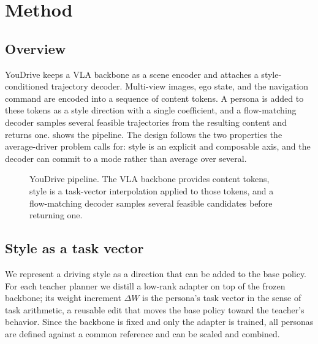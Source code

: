 \section{Method}
\label{sec:method}

\subsection{Overview}
\label{sec:method:overview}
YouDrive keeps a VLA backbone as a scene encoder and attaches a style-conditioned
trajectory decoder. Multi-view images, ego state, and the navigation command are
encoded into a sequence of content tokens. A persona is added to these tokens as a
style direction with a single coefficient, and a flow-matching decoder samples
several feasible trajectories from the resulting content and returns one.
 shows the pipeline. The design follows the two properties the
average-driver problem calls for: style is an explicit and composable axis, and the
decoder can commit to a mode rather than average over several.

\begin{figure}[t]
    \centering
    \caption{YouDrive pipeline. The VLA backbone provides content tokens, style is
    a task-vector interpolation applied to those tokens, and a flow-matching decoder
    samples several feasible candidates before returning one.}
    \label{fig:pipeline}
\end{figure}

\subsection{Style as a task vector}
\label{sec:method:style}
We represent a driving style as a direction that can be added to the base policy.
For each teacher planner we distill a low-rank adapter on top of the frozen
backbone; its weight increment $\Delta W$ is the persona's task vector in the sense
of task arithmetic, a reusable edit that moves the base policy toward the teacher's
behavior. Since the backbone is fixed and only the adapter is trained, all personas
are defined against a common reference and can be scaled and combined.

